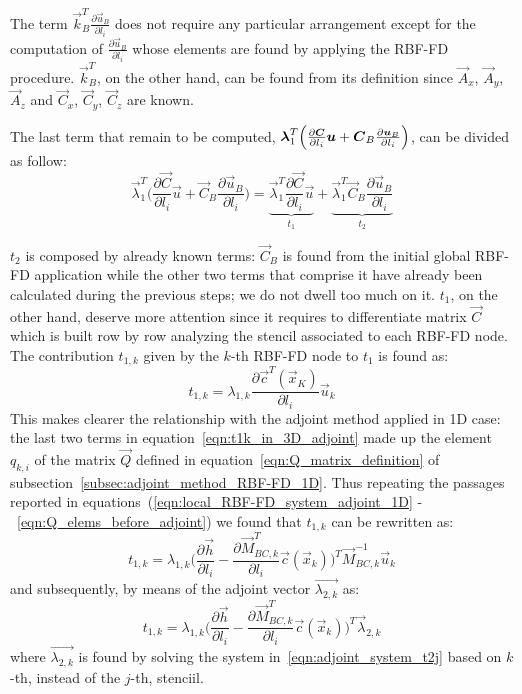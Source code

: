 \medskip
The term $\vec{k}_B^T \frac{\partial \vec{u}_B}{\partial l_i}$ does not require any particular arrangement except for the computation of $\frac{\partial \vec{u}_B}{\partial l_i}$ whose elements are found by applying the RBF-FD procedure. $\vec{k}_B^T$, on the other hand, can be found from its definition since $\vec{A}_x$, $\vec{A}_y$, $\vec{A}_z$ and $\vec{C}_x$, $\vec{C}_y$, $\vec{C}_z$ are known.

\medskip
The last term that remain to be computed, $\vec{\lambda}_1^T \Bigl( \frac{\partial \vec{C}}{\partial l_i}\vec{u} + \vec{C}_B\frac{\partial \vec{u}_B}{\partial l_i} \Bigr)$, can be divided as follow:
\begin{equation}
	\vec{\lambda}_1^T \biggl( \frac{\partial \vec{C}}{\partial l_i}\vec{u} + \vec{C}_B\frac{\partial \vec{u}_B}{\partial l_i} \biggr) = \underbrace{\vec{\lambda}_1^T \frac{\partial \vec{C}}{\partial l_i} \vec{u}}_{t_1} + \underbrace{\vec{\lambda}_1^T \vec{C}_B \frac{\partial \vec{u}_B}{\partial l_i}}_{t_2}
\end{equation}

$t_2$ is composed by already known terms: $\vec{C}_B$ is found from the initial global RBF-FD application while the other two terms that comprise it have already been calculated during the previous steps; we do not dwell too much on it. $t_1$, on the other hand, deserve more attention since it requires to differentiate matrix $\vec{C}$ which is built row by row analyzing the stencil associated to each RBF-FD node.
The contribution $t_{1,k}$ given by the $k$-th RBF-FD node to $t_1$ is found as:
\begin{equation}
	\label{eqn:t1k_in_3D_adjoint}
	t_{1,k} = \lambda_{1,k} \frac{\partial \vec{c}^T(\vec{x}_K)}{\partial l_i} \vec{u}_k
\end{equation}
This makes clearer the relationship with the adjoint method applied in 1D case: the last two terms in equation~\eqref{eqn:t1k_in_3D_adjoint} made up the element $q_{k,i}$ of the matrix $\vec{Q}$ defined in equation~\eqref{eqn:Q_matrix_definition} of subsection~\ref{subsec:adjoint_method_RBF-FD_1D}. Thus repeating the passages reported in equations~(\ref{eqn:local_RBF-FD_system_adjoint_1D} -~\ref{eqn:Q_elems_before_adjoint}) we found that $t_{1,k}$ can be rewritten as:
\begin{equation}
	 t_{1,k} = \lambda_{1,k} \biggl( \frac{\partial \vec{h}}{\partial l_i} - \frac{\partial \vec{M}_{BC,k}^T}{\partial l_i} \vec{c}(\vec{x}_k) \biggr)^T \vec{M}_{BC,k}^{-1} \vec{u}_k
\end{equation}
and subsequently, by means of the adjoint vector $\vec{\lambda_{2,k}}$ as:
\begin{equation}
	t_{1,k} = \lambda_{1,k} \biggl( \frac{\partial \vec{h}}{\partial l_i} - \frac{\partial \vec{M}_{BC,k}^T}{\partial l_i} \vec{c}(\vec{x}_k) \biggr)^T \vec{\lambda}_{2,k}
\end{equation}
where $\vec{\lambda_{2,k}}$ is found by solving the system in~\eqref{eqn:adjoint_system_t2j} based on $k$-th, instead of the $j$-th, stenciil.

